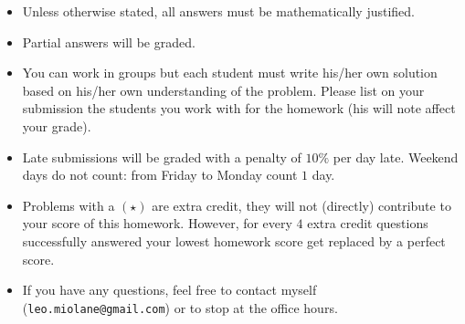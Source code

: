 \centerline{}
{\small
	\begin{itemize}
		\item Unless otherwise stated, all answers must be mathematically justified.
		\item Partial answers will be graded. 
		\item You can work in groups but each student must write his/her own solution based on his/her own understanding of the problem. Please list on your submission the students you work with for the homework (his will note affect your grade).
		\item Late submissions will be graded with a penalty of $10\%$ per day late. Weekend days do not count: from Friday to Monday count $1$ day.
		\item Problems with a $(\star)$ are extra credit, they will not (directly) contribute to your score of this homework. However, for every $4$ extra credit questions successfully answered your lowest homework score get replaced by a perfect score.
		\item If you have any questions, feel free to contact myself (\texttt{leo.miolane@gmail.com}) or to stop at the office hours.
	\end{itemize}
}
\vspace{-0.4cm}
\centerline{}
\vspace{0.5cm}
